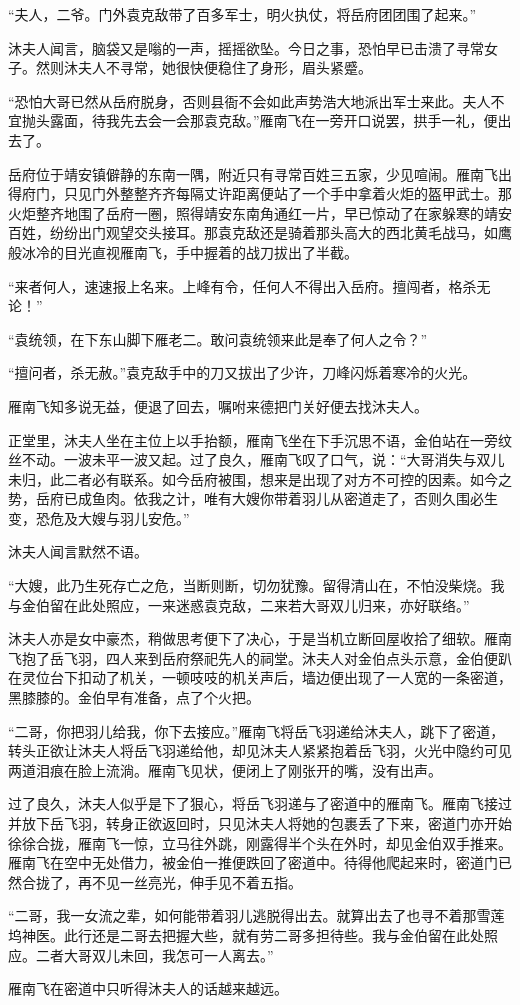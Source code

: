 “夫人，二爷。门外袁克敌带了百多军士，明火执仗，将岳府团团围了起来。”

沐夫人闻言，脑袋又是嗡的一声，摇摇欲坠。今日之事，恐怕早已击溃了寻常女子。然则沐夫人不寻常，她很快便稳住了身形，眉头紧蹙。

“恐怕大哥已然从岳府脱身，否则县衙不会如此声势浩大地派出军士来此。夫人不宜抛头露面，待我先去会一会那袁克敌。”雁南飞在一旁开口说罢，拱手一礼，便出去了。

岳府位于靖安镇僻静的东南一隅，附近只有寻常百姓三五家，少见喧闹。雁南飞出得府门，只见门外整整齐齐每隔丈许距离便站了一个手中拿着火炬的盔甲武士。那火炬整齐地围了岳府一圈，照得靖安东南角通红一片，早已惊动了在家躲寒的靖安百姓，纷纷出门观望交头接耳。那袁克敌还是骑着那头高大的西北黄毛战马，如鹰般冰冷的目光直视雁南飞，手中握着的战刀拔出了半截。

“来者何人，速速报上名来。上峰有令，任何人不得出入岳府。擅闯者，格杀无论！”

“袁统领，在下东山脚下雁老二。敢问袁统领来此是奉了何人之令？”

“擅问者，杀无赦。”袁克敌手中的刀又拔出了少许，刀峰闪烁着寒冷的火光。

雁南飞知多说无益，便退了回去，嘱咐来德把门关好便去找沐夫人。

正堂里，沐夫人坐在主位上以手抬额，雁南飞坐在下手沉思不语，金伯站在一旁纹丝不动。一波未平一波又起。过了良久，雁南飞叹了口气，说：“大哥消失与双儿未归，此二者必有联系。如今岳府被围，想来是出现了对方不可控的因素。如今之势，岳府已成鱼肉。依我之计，唯有大嫂你带着羽儿从密道走了，否则久围必生变，恐危及大嫂与羽儿安危。”

沐夫人闻言默然不语。

“大嫂，此乃生死存亡之危，当断则断，切勿犹豫。留得清山在，不怕没柴烧。我与金伯留在此处照应，一来迷惑袁克敌，二来若大哥双儿归来，亦好联络。”

沐夫人亦是女中豪杰，稍做思考便下了决心，于是当机立断回屋收拾了细软。雁南飞抱了岳飞羽，四人来到岳府祭祀先人的祠堂。沐夫人对金伯点头示意，金伯便趴在灵位台下扣动了机关，一顿吱吱的机关声后，墙边便出现了一人宽的一条密道，黑膝膝的。金伯早有准备，点了个火把。

“二哥，你把羽儿给我，你下去接应。”雁南飞将岳飞羽递给沐夫人，跳下了密道，转头正欲让沐夫人将岳飞羽递给他，却见沐夫人紧紧抱着岳飞羽，火光中隐约可见两道泪痕在脸上流淌。雁南飞见状，便闭上了刚张开的嘴，没有出声。

过了良久，沐夫人似乎是下了狠心，将岳飞羽递与了密道中的雁南飞。雁南飞接过并放下岳飞羽，转身正欲返回时，只见沐夫人将她的包裹丢了下来，密道门亦开始徐徐合拢，雁南飞一惊，立马往外跳，刚露得半个头在外时，却见金伯双手推来。雁南飞在空中无处借力，被金伯一推便跌回了密道中。待得他爬起来时，密道门已然合拢了，再不见一丝亮光，伸手见不着五指。

“二哥，我一女流之辈，如何能带着羽儿逃脱得出去。就算出去了也寻不着那雪莲坞神医。此行还是二哥去把握大些，就有劳二哥多担待些。我与金伯留在此处照应。二者大哥双儿未回，我怎可一人离去。”

雁南飞在密道中只听得沐夫人的话越来越远。